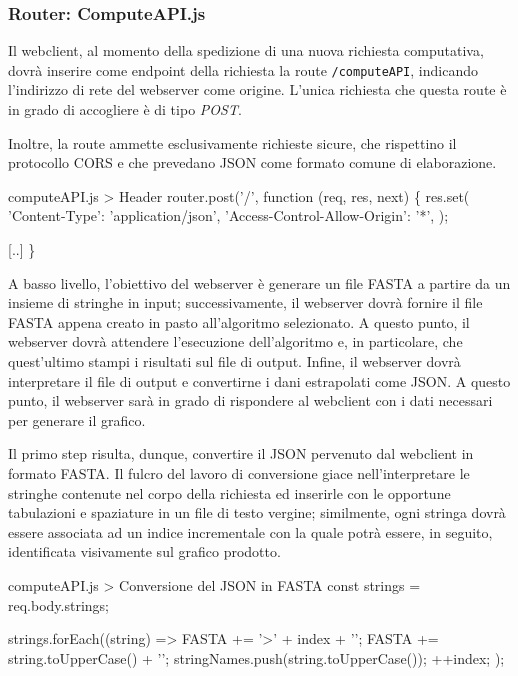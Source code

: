 \subsubsection{Router: ComputeAPI.js}

Il webclient, al momento della spedizione di una nuova richiesta computativa, dovrà inserire come endpoint della richiesta la route \verb|/computeAPI|, indicando l'indirizzo di rete del webserver come origine. L'unica richiesta che questa route è in grado di accogliere è di tipo \textit{POST}. 

Inoltre, la route ammette esclusivamente richieste sicure, che rispettino il protocollo CORS e che prevedano JSON come formato comune di elaborazione.

\begin{sexylisting}{computeAPI.js > Header}
router.post('/', function (req, res, next) \{
	res.set({
		'Content-Type': 'application/json',
		'Access-Control-Allow-Origin': '*',
	});
	
    [..]
\}
\end{sexylisting}

A basso livello, l'obiettivo del webserver è generare un file FASTA a partire da un insieme di stringhe in input; successivamente, il webserver dovrà fornire il file FASTA appena creato in pasto all'algoritmo selezionato. A questo punto, il webserver dovrà attendere l'esecuzione dell'algoritmo e, in particolare, che quest'ultimo stampi i risultati sul file di output. Infine, il webserver dovrà interpretare il file di output e convertirne i dani estrapolati come JSON. A questo punto, il webserver sarà in grado di rispondere al webclient con i dati necessari per generare il grafico.

\vspace{3mm}

Il primo step risulta, dunque, convertire il JSON pervenuto dal webclient in formato FASTA. Il fulcro del lavoro di conversione giace nell'interpretare le stringhe contenute nel corpo della richiesta ed inserirle con le opportune tabulazioni e spaziature in un file di testo vergine; similmente, ogni stringa dovrà essere associata ad un indice incrementale con la quale potrà essere, in seguito, identificata visivamente sul grafico prodotto.

\begin{sexylisting}{computeAPI.js > Conversione del JSON in FASTA}
const strings = req.body.strings;
	
strings.forEach((string) => {
	FASTA += '>' + index + '\n';
	FASTA += string.toUpperCase() + '\n';
	stringNames.push(string.toUpperCase());
	++index;
});
\end{sexylisting}

